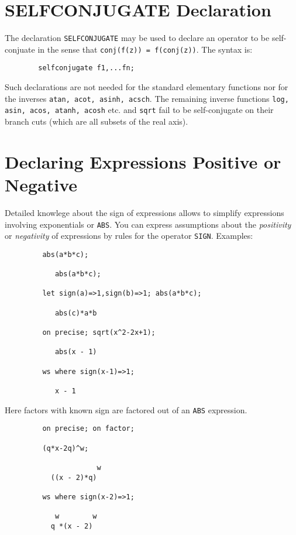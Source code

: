 \section{SELFCONJUGATE Declaration}
\hypertarget{command:SELFCONJUGATE}{}

The declaration \texttt{SELFCONJUGATE} may be used 
to declare an operator to be self-conjuate in the sense that
\texttt{conj(f(z)) = f(conj(z))}. The syntax is:
\begin{verbatim}
        selfconjugate f1,...fn;
\end{verbatim}

Such declarations are not needed for the standard elementary functions nor
for the inverses \texttt{atan, acot, asinh, acsch}. The remaining inverse
functions \texttt{log, asin, acos, atanh, acosh} etc. and
\texttt{sqrt} fail to be self-conjugate on their branch cuts (which are all
subsets of the real axis).

\section{Declaring Expressions Positive or Negative}

Detailed knowlege about the sign of expressions allows {\REDUCE}
to simplify expressions involving exponentials or \texttt{ABS}.
You can express assumptions about the 
\emph{positivity} or \emph{negativity}
of expressions by rules for the operator \texttt{SIGN}.
Examples:
\begin{verbatim}
         abs(a*b*c);
      
            abs(a*b*c);

         let sign(a)=>1,sign(b)=>1; abs(a*b*c);

            abs(c)*a*b

         on precise; sqrt(x^2-2x+1);

            abs(x - 1)

         ws where sign(x-1)=>1;

            x - 1
\end{verbatim}
Here factors with known sign are factored out of an \texttt{ABS} expression.
\begin{verbatim}
         on precise; on factor; 

         (q*x-2q)^w;

                      w
           ((x - 2)*q)

         ws where sign(x-2)=>1;

            w        w
           q *(x - 2)

\end{verbatim}
       
